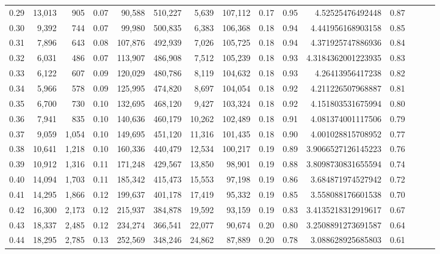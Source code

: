 \begin{tabular}{rrrrrrrrrrrrrrr}
0.29 &  13,013 &    905 &  0.07 &   90,588 &  510,227 &    5,639 &  107,112 &  0.17 &  0.95 &        4.52525476492448 &      0.87 \\
0.30 &   9,392 &    744 &  0.07 &   99,980 &  500,835 &    6,383 &  106,368 &  0.18 &  0.94 &       4.441956168903158 &      0.85 \\
0.31 &   7,896 &    643 &  0.08 &  107,876 &  492,939 &    7,026 &  105,725 &  0.18 &  0.94 &       4.371925747886936 &      0.84 \\
0.32 &   6,031 &    486 &  0.07 &  113,907 &  486,908 &    7,512 &  105,239 &  0.18 &  0.93 &      4.3184362001223935 &      0.83 \\
0.33 &   6,122 &    607 &  0.09 &  120,029 &  480,786 &    8,119 &  104,632 &  0.18 &  0.93 &        4.26413956417238 &      0.82 \\
0.34 &   5,966 &    578 &  0.09 &  125,995 &  474,820 &    8,697 &  104,054 &  0.18 &  0.92 &       4.211226507968887 &      0.81 \\
0.35 &   6,700 &    730 &  0.10 &  132,695 &  468,120 &    9,427 &  103,324 &  0.18 &  0.92 &       4.151803531675994 &      0.80 \\
0.36 &   7,941 &    835 &  0.10 &  140,636 &  460,179 &   10,262 &  102,489 &  0.18 &  0.91 &       4.081374001117506 &      0.79 \\
0.37 &   9,059 &  1,054 &  0.10 &  149,695 &  451,120 &   11,316 &  101,435 &  0.18 &  0.90 &       4.001028815708952 &      0.77 \\
0.38 &  10,641 &  1,218 &  0.10 &  160,336 &  440,479 &   12,534 &  100,217 &  0.19 &  0.89 &      3.9066527126145223 &      0.76 \\
0.39 &  10,912 &  1,316 &  0.11 &  171,248 &  429,567 &   13,850 &   98,901 &  0.19 &  0.88 &      3.8098730831655594 &      0.74 \\
0.40 &  14,094 &  1,703 &  0.11 &  185,342 &  415,473 &   15,553 &   97,198 &  0.19 &  0.86 &       3.684871974527942 &      0.72 \\
0.41 &  14,295 &  1,866 &  0.12 &  199,637 &  401,178 &   17,419 &   95,332 &  0.19 &  0.85 &       3.558088176601538 &      0.70 \\
0.42 &  16,300 &  2,173 &  0.12 &  215,937 &  384,878 &   19,592 &   93,159 &  0.19 &  0.83 &      3.4135218312919617 &      0.67 \\
0.43 &  18,337 &  2,485 &  0.12 &  234,274 &  366,541 &   22,077 &   90,674 &  0.20 &  0.80 &      3.2508891273691587 &      0.64 \\
0.44 &  18,295 &  2,785 &  0.13 &  252,569 &  348,246 &   24,862 &   87,889 &  0.20 &  0.78 &       3.088628925685803 &      0.61 \\

\end{tabular}
